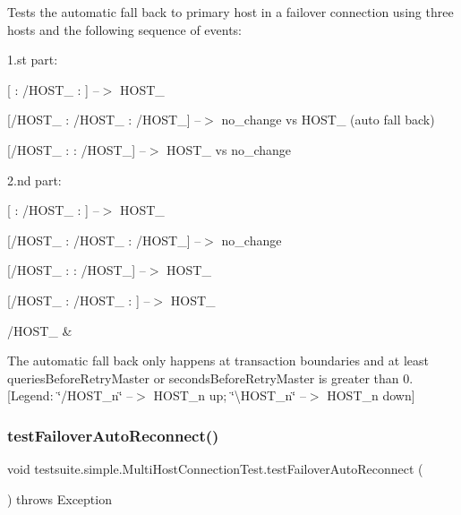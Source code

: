 Tests the automatic fall back to primary host in a failover connection using three hosts and the following sequence of events\+:
\begin{DoxyItemize}
\item 1.\+st part\+:
\item \mbox{[} \+: /\+H\+O\+S\+T\+\_ \+: \mbox{]} --$>$ H\+O\+S\+T\+\_
\item \mbox{[}/\+H\+O\+S\+T\+\_ \+: /\+H\+O\+S\+T\+\_ \+: /\+H\+O\+S\+T\+\_\mbox{]} --$>$ no\+\_\+change vs H\+O\+S\+T\+\_ (auto fall back)
\item \mbox{[}/\+H\+O\+S\+T\+\_ \+:  \+: /\+H\+O\+S\+T\+\_\mbox{]} --$>$ H\+O\+S\+T\+\_ vs no\+\_\+change
\item 2.\+nd part\+:
\item \mbox{[} \+: /\+H\+O\+S\+T\+\_ \+: \mbox{]} --$>$ H\+O\+S\+T\+\_
\item \mbox{[}/\+H\+O\+S\+T\+\_ \+: /\+H\+O\+S\+T\+\_ \+: /\+H\+O\+S\+T\+\_\mbox{]} --$>$ no\+\_\+change
\item \mbox{[}/\+H\+O\+S\+T\+\_ \+:  \+: /\+H\+O\+S\+T\+\_\mbox{]} --$>$ H\+O\+S\+T\+\_
\item \mbox{[}/\+H\+O\+S\+T\+\_ \+: /\+H\+O\+S\+T\+\_ \+: \mbox{]} --$>$ H\+O\+S\+T\+\_
\item /\+H\+O\+S\+T\+\_ \& 
\end{DoxyItemize}

The automatic fall back only happens at transaction boundaries and at least \textquotesingle{}queries\+Before\+Retry\+Master\textquotesingle{} or \textquotesingle{}seconds\+Before\+Retry\+Master\textquotesingle{} is greater than 0. \mbox{[}Legend\+: \char`\"{}/\+H\+O\+S\+T\+\_\+n\char`\"{} --$>$ H\+O\+S\+T\+\_\+n up; \char`\"{}\textbackslash{}\+H\+O\+S\+T\+\_\+n\char`\"{} --$>$ H\+O\+S\+T\+\_\+n down\mbox{]} \mbox{\label{classtestsuite_1_1simple_1_1_multi_host_connection_test_a17cbfd2022e45098966fc67a16d7988a}} 
\subsubsection{\texorpdfstring{test\+Failover\+Auto\+Reconnect()}{testFailoverAutoReconnect()}}
{\footnotesize\ttfamily void testsuite.\+simple.\+Multi\+Host\+Connection\+Test.\+test\+Failover\+Auto\+Reconnect (\begin{DoxyParamCaption}{ }\end{DoxyParamCaption}) throws Exception}

